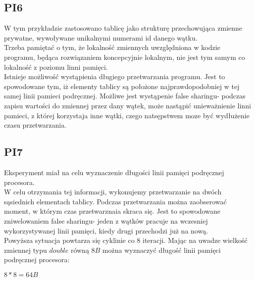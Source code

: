\documentclass{article}
\begin{document}
\subsection{PI6}
W tym przykładzie zastosowano tablicę jako strukturę przechowująca zmienne prywatne, wywoływane unikalnymi numerami id danego wątku. \\
Trzeba pamiętać o tym, że lokalność zmiennych uwzględniona w kodzie programu, będąca rozwiązaniem koncepcyjnie lokalnym, nie jest tym samym co lokalność z poziomu linni pamięci.\\
Istnieje możliwość wystąpienia długiego przetwarzania programu. Jest to spowodowane tym, iż elementy tablicy są położone najprawdopodobniej w tej samej linii pamieci podręcznej. Możliwe jest wystąpenie false sharingu- podczas zapisu wartości do zmiennej przez dany wątek, może nastąpić unieważnienie linni pamieci, z której korzystaja inne wątki, czego natsępstwem moze być wydłużenie czasu przetwarzania.
\subsection{PI7}
Eksperyment miał na celu wyznaczenie długości linii pamięci podręcznej procesora. \\
W celu otrzymania tej informacji, wykonujemy przetwarzanie na dwóch sąsiednich elementach tablicy. Podczas przetwarzania można zaobserować moment, w którym czas przetwarznaia skraca się. Jest to spowodowane zniwelowaniem false sharingu- jeden z wątków pracuje na wczesniej wykorzystywanej linii pamięci, kiedy drugi przechodzi już na nową.\\
Powyższa sytuacja powtarza się cyklinie co 8 iteracji. Mając na uwadze wielkość zmiennej typu $double$ równą $8B$ można wyznaczyć długość linii pamięci podręcznej procesora:
\begin{center}
    $8 * 8 = 64B$
\end{center}
\end{document}
